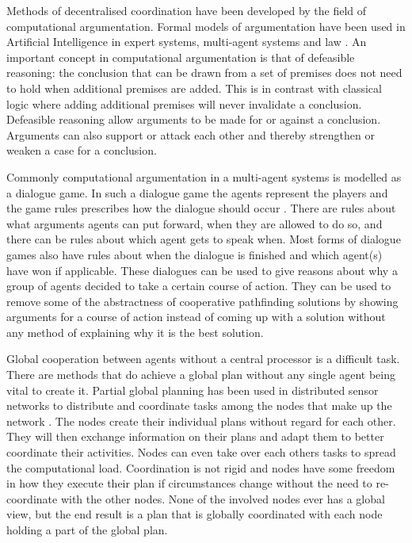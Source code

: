 Methods of decentralised coordination have been developed by the field of 
computational argumentation. Formal models of argumentation have been used in 
Artificial Intelligence in expert systems, multi-agent systems and law
\cite{vaneemeren2014,rahwan2009}. An important concept in computational 
argumentation is that of
defeasible reasoning: the conclusion that can be drawn from a set of premises
does not need to hold when additional premises are added. This is in contrast
with classical logic where adding additional premises will never invalidate a
conclusion. Defeasible reasoning allow arguments to be made for or against a
conclusion. Arguments can also support or attack each other and thereby
strengthen or weaken a case for a conclusion.

Commonly computational argumentation in a multi-agent systems is modelled as a 
dialogue game.
In such a dialogue game the agents represent the players and the game rules
prescribes how the dialogue should occur \cite{walton1995}. There are rules
about what arguments agents can put forward, when they are allowed to do so,
and there can be rules about which agent gets to speak when. Most forms of
dialogue games also have rules about when the dialogue is finished and which
agent(s) have won if applicable. These dialogues can be used to give reasons
about why a group of agents decided to take a certain course of action. They
can be used to remove some of the abstractness of cooperative pathfinding
solutions by showing arguments for a course of action instead of coming up with
a solution without any method of explaining why it is the best solution.

Global cooperation between agents without a central processor is a difficult 
task. There are methods that do achieve a global plan without any single agent 
being vital to create it.
Partial global planning has been used in distributed sensor networks to
distribute and coordinate tasks among the nodes that make up the network
\cite{durfee1991}. The nodes create their individual plans without regard for
each other. They will then exchange information on their plans and adapt them
to better coordinate their activities. Nodes can even take over each others
tasks to spread the computational load. Coordination is not rigid and nodes have
some freedom in how they execute their plan if circumstances change without
the need to re-coordinate with the other nodes. None of the involved nodes ever
has a global view, but the end result is a plan that is globally coordinated
with each node holding a part of the global plan.

